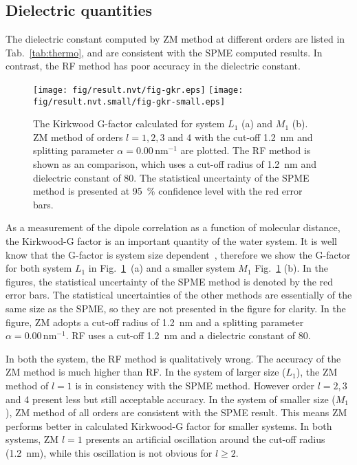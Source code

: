 \documentclass[aip,jcp,a4paper,preprint,unsortedaddress,onecolumn,fleqn]{revtex4-1}
\newcommand{\systemmb}{M_1}
\newcommand{\systemlb}{L_1}
\begin{document}
\subsection{Dielectric quantities}

The dielectric constant computed by ZM method at different orders are listed in Tab.~\ref{tab:thermo},
and are consistent with the SPME computed results. In contrast, the RF method has poor accuracy in
the dielectric constant.

\begin{figure}
  \centering
  \texttt{[image: fig/result.nvt/fig-gkr.eps]}
  \texttt{[image: fig/result.nvt.small/fig-gkr-small.eps]}
  \caption{The Kirkwood G-factor calculated for system $\systemlb$ (a) and $\systemmb$ (b).
    ZM method of orders $l=1,2,3$ and 4 with the cut-off 1.2~nm and splitting parameter $\alpha = 0.00\,\textrm{nm}^{-1}$ are plotted.
    The RF method is shown as an comparison, which uses a cut-off radius of 1.2~nm and dielectric constant of 80.
    The statistical uncertainty of the SPME method is presented at 95~\% confidence level with the red error bars.
  }
  \label{fig:gkr}
\end{figure}

As a measurement of the dipole correlation as a function of molecular distance, the Kirkwood-G factor
is an important quantity of the water system.
It is well know that the G-factor is system size
dependent~\cite{vanderSpoel2006origin}, therefore we show the G-factor for
both  system $\systemlb$ in Fig.~\ref{fig:gkr}~(a) and a smaller system $\systemmb$
Fig.~\ref{fig:gkr} (b).  In the figures, the statistical uncertainty of
the SPME method is denoted by the red error bars. The statistical uncertainties of the
other methods are essentially of the same size as the SPME, so they are not presented in the figure for
clarity.  In the figure, ZM adopts a cut-off radius of 1.2~nm and a splitting parameter $\alpha = 0.00\,\textrm{nm}^{-1}$.
RF uses a cut-off 1.2~nm and a dielectric constant of 80.

In both the system, the RF method is qualitatively
wrong. The accuracy of the ZM method is much higher than RF.
In the system of larger size ($\systemlb$), the ZM method of $l=1$ is in consistency with the SPME method. However
order $l=2,3$ and 4  present less but still acceptable accuracy.
In the system of smaller size ($\systemmb$), ZM method of all orders are consistent with the SPME result.
This means ZM performs better in calculated Kirkwood-G factor for smaller systems.
In both systems, ZM $l=1$ presents  an artificial
oscillation around the cut-off radius (1.2~nm), while this oscillation is
not obvious for $l\geq 2$.
\end{document}
